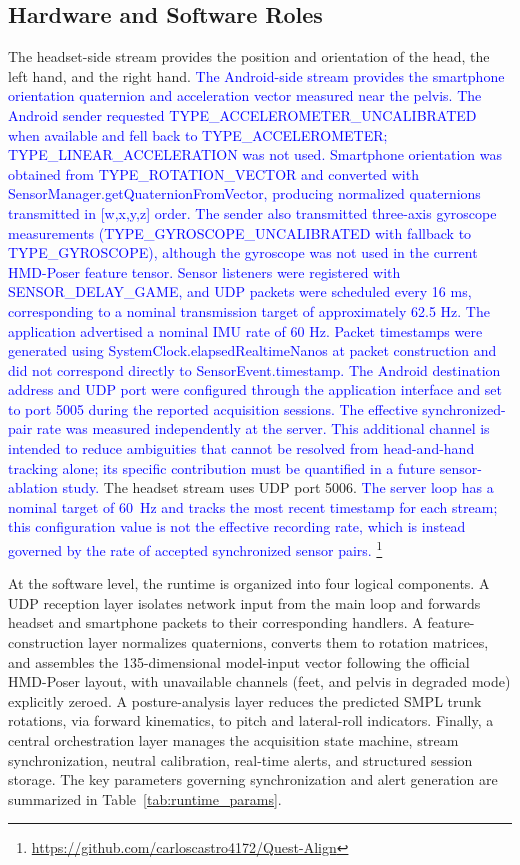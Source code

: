 \documentclass[conference]{IEEEtran}
\newcommand{\CC}[1]{\textcolor{blue}{#1}}
\begin{document}
\subsection{Hardware and Software Roles}
The headset-side stream provides the position and orientation of the head, the left hand,
and the right hand. \CC{The Android-side stream provides the smartphone orientation quaternion and acceleration vector measured near the pelvis. The Android sender requested TYPE\_ACCELEROMETER\_UNCALIBRATED when available and fell back to TYPE\_ACCELEROMETER; TYPE\_LINEAR\_ACCELERATION was not used. Smartphone orientation was obtained from TYPE\_ROTATION\_VECTOR and converted with SensorManager.getQuaternionFromVector, producing normalized quaternions transmitted in [w,x,y,z] order. The sender also transmitted three-axis gyroscope measurements (TYPE\_GYROSCOPE\_UNCALIBRATED with fallback to TYPE\_GYROSCOPE), although the gyroscope was not used in the current HMD-Poser feature tensor. Sensor listeners were registered with SENSOR\_DELAY\_GAME, and UDP packets were scheduled every 16 ms, corresponding to a nominal transmission target of approximately 62.5 Hz. The application advertised a nominal IMU rate of 60 Hz. Packet timestamps were generated using SystemClock.elapsedRealtimeNanos at packet construction and did not correspond directly to SensorEvent.timestamp. The Android destination address and UDP port were configured through the application interface and set to port 5005 during the reported acquisition sessions. The effective synchronized-pair rate was measured independently at the server. This additional channel is intended to reduce ambiguities that cannot be resolved from head-and-hand tracking alone; its specific contribution must be quantified in a future sensor-ablation study.} The headset stream uses UDP port 5006. \CC{The server loop has a nominal target of 60~Hz and tracks the most recent
timestamp for each stream; this configuration value is not the effective recording rate,
which is instead governed by the rate of accepted synchronized sensor pairs.}
\footnote{\url{https://github.com/carloscastro4172/Quest-Align}}

At the software level, the runtime is organized into four logical components. A UDP
reception layer isolates network input from the main loop and forwards headset and
smartphone packets to their corresponding handlers. A feature-construction layer
normalizes quaternions, converts them to rotation matrices, and assembles the
135-dimensional model-input vector following the official HMD-Poser layout, with
unavailable channels (feet, and pelvis in degraded mode) explicitly zeroed. A
posture-analysis layer reduces the predicted SMPL trunk rotations, via forward kinematics,
to pitch and lateral-roll indicators. Finally, a central orchestration layer
manages the acquisition state machine, stream synchronization, neutral calibration,
real-time alerts, and structured session storage. The key parameters governing
synchronization and alert generation are summarized in
Table~\ref{tab:runtime_params}.
\end{document}

